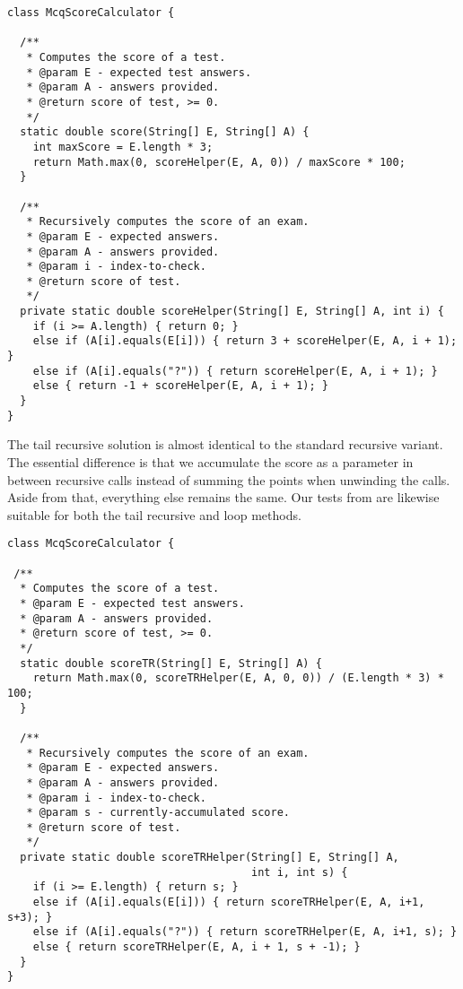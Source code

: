 \begin{lstlisting}[language=MyJava]
class McqScoreCalculator {

  /**
   * Computes the score of a test.
   * @param E - expected test answers.
   * @param A - answers provided.
   * @return score of test, >= 0.
   */
  static double score(String[] E, String[] A) {
    int maxScore = E.length * 3;
    return Math.max(0, scoreHelper(E, A, 0)) / maxScore * 100;
  }

  /**
   * Recursively computes the score of an exam.
   * @param E - expected answers.
   * @param A - answers provided.
   * @param i - index-to-check.
   * @return score of test.
   */
  private static double scoreHelper(String[] E, String[] A, int i) {
    if (i >= A.length) { return 0; }
    else if (A[i].equals(E[i])) { return 3 + scoreHelper(E, A, i + 1); }
    else if (A[i].equals("?")) { return scoreHelper(E, A, i + 1); }
    else { return -1 + scoreHelper(E, A, i + 1); }
  }
}
\end{lstlisting}

The tail recursive solution is almost identical to the standard recursive variant. The essential difference is that we accumulate the score as a parameter in between recursive calls instead of summing the points when unwinding the calls. Aside from that, everything else remains the same. Our tests from  are likewise suitable for both the tail recursive and loop methods.

\enlargethispage{-5\baselineskip}
\begin{lstlisting}[language=MyJava]
class McqScoreCalculator {

 /**
  * Computes the score of a test.
  * @param E - expected test answers.
  * @param A - answers provided.
  * @return score of test, >= 0.
  */
  static double scoreTR(String[] E, String[] A) {
    return Math.max(0, scoreTRHelper(E, A, 0, 0)) / (E.length * 3) * 100;
  }
 
  /**
   * Recursively computes the score of an exam.
   * @param E - expected answers.
   * @param A - answers provided.
   * @param i - index-to-check.
   * @param s - currently-accumulated score.
   * @return score of test.
   */
  private static double scoreTRHelper(String[] E, String[] A, 
                                      int i, int s) {
    if (i >= E.length) { return s; }
    else if (A[i].equals(E[i])) { return scoreTRHelper(E, A, i+1, s+3); }
    else if (A[i].equals("?")) { return scoreTRHelper(E, A, i+1, s); }
    else { return scoreTRHelper(E, A, i + 1, s + -1); }
  }
}
\end{lstlisting}

